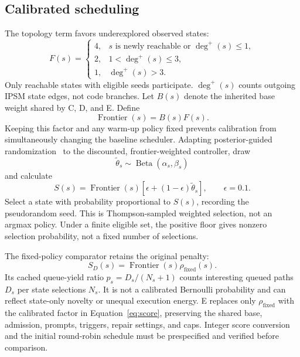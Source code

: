 \documentclass[final,5p,times,number]{elsarticle}
\begin{document}
\subsection{Calibrated scheduling}
The topology term favors underexplored observed states:
\begin{equation}
F(s)=
\begin{cases}
4,&s\text{ is newly reachable or }\deg^+(s)\leq1,\\
2,&1<\deg^+(s)\leq3,\\
1,&\deg^+(s)>3.
\end{cases}
\end{equation}
Only reachable states with eligible seeds participate. $\deg^+(s)$ counts outgoing IPSM state edges, not code branches. Let $B(s)$ denote the inherited base weight shared by C, D, and E. Define
\begin{equation}
\operatorname{Frontier}(s)=B(s)F(s).
\end{equation}
Keeping this factor and any warm-up policy fixed prevents calibration from simultaneously changing the baseline scheduler. Adapting posterior-guided randomization~\cite{thompson1933} to the discounted, frontier-weighted controller, draw
\begin{equation}
\widetilde{\theta}_s\sim\operatorname{Beta}(\alpha_s,\beta_s)
\end{equation}
and calculate
\begin{equation}
S(s)=\operatorname{Frontier}(s)[\epsilon+(1-\epsilon)\widetilde{\theta}_s],
\qquad\epsilon=0.1.
\label{eq:score}
\end{equation}
Select a state with probability proportional to $S(s)$, recording the pseudorandom seed. This is Thompson-sampled weighted selection, not an argmax policy. Under a finite eligible set, the positive floor gives nonzero selection probability, not a fixed number of selections.

The fixed-policy comparator retains the original penalty:
\begin{equation}
S_D(s)=\operatorname{Frontier}(s)\rho_{\mathrm{fixed}}(s).
\end{equation}
Its cached queue-yield ratio $p_s=D_s/(N_s+1)$ counts interesting queued paths $D_s$ per state selections $N_s$. It is not a calibrated Bernoulli probability and can reflect state-only novelty or unequal execution energy. E replaces only $\rho_{\mathrm{fixed}}$ with the calibrated factor in Equation~\ref{eq:score}, preserving the shared base, admission, prompts, triggers, repair settings, and caps. Integer score conversion and the initial round-robin schedule must be prespecified and verified before comparison.
\end{document}
